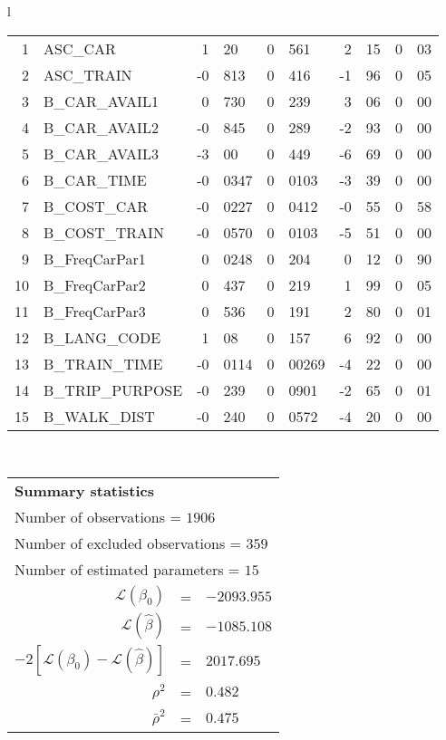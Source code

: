 \begin{tabular}{l}
\begin{tabular}{rlr@{.}lr@{.}lr@{.}lr@{.}l}
1 & ASC_CAR & 1&20 & 0&561 & 2&15 & 0&03\\
2 & ASC_TRAIN & -0&813 & 0&416 & -1&96 & 0&05\\
3 & B_CAR_AVAIL1 & 0&730 & 0&239 & 3&06 & 0&00\\
4 & B_CAR_AVAIL2 & -0&845 & 0&289 & -2&93 & 0&00\\
5 & B_CAR_AVAIL3 & -3&00 & 0&449 & -6&69 & 0&00\\
6 & B_CAR_TIME & -0&0347 & 0&0103 & -3&39 & 0&00\\
7 & B_COST_CAR & -0&0227 & 0&0412 & -0&55 & 0&58\\
8 & B_COST_TRAIN & -0&0570 & 0&0103 & -5&51 & 0&00\\
9 & B_FreqCarPar1 & 0&0248 & 0&204 & 0&12 & 0&90\\
10 & B_FreqCarPar2 & 0&437 & 0&219 & 1&99 & 0&05\\
11 & B_FreqCarPar3 & 0&536 & 0&191 & 2&80 & 0&01\\
12 & B_LANG_CODE & 1&08 & 0&157 & 6&92 & 0&00\\
13 & B_TRAIN_TIME & -0&0114 & 0&00269 & -4&22 & 0&00\\
14 & B_TRIP_PURPOSE & -0&239 & 0&0901 & -2&65 & 0&01\\
15 & B_WALK_DIST & -0&240 & 0&0572 & -4&20 & 0&00\\
\hline
\end{tabular}
\\
\begin{tabular}{rcl}
\multicolumn{3}{l}{\bf Summary statistics}\\
\multicolumn{3}{l}{ Number of observations = $1906$} \\
\multicolumn{3}{l}{ Number of excluded observations = $359$} \\
\multicolumn{3}{l}{ Number of estimated  parameters = $15$} \\
 $\mathcal{L}(\beta_0)$ &=&  $-2093.955$ \\
 $\mathcal{L}(\hat{\beta})$ &=& $-1085.108 $  \\
 $-2[\mathcal{L}(\beta_0) -\mathcal{L}(\hat{\beta})]$ &=& $2017.695$ \\
    $\rho^2$ &=&   $0.482$ \\
    $\bar{\rho}^2$ &=&    $0.475$ \\
\end{tabular}
  \end{tabular}
